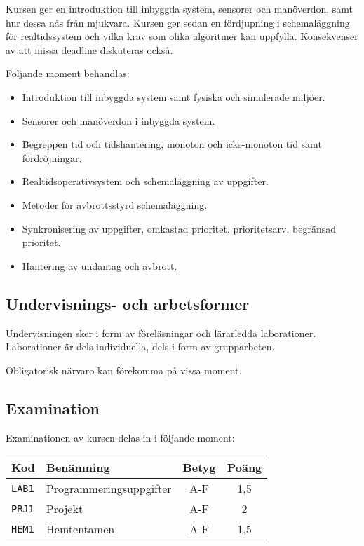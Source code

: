 Kursen ger en introduktion till inbyggda system, sensorer och
manöverdon, samt hur dessa nås från mjukvara. Kursen ger sedan en
fördjupning i schemaläggning för realtidssystem och vilka krav som olika
algoritmer kan uppfylla. Konsekvenser av att missa deadline diskuteras
också.

Följande moment behandlas:

\begin{itemize}
\tightlist
\item
  Introduktion till inbyggda system samt fysiska och simulerade miljöer.
\item
  Sensorer och manöverdon i inbyggda system.
\item
  Begreppen tid och tidshantering, monoton och icke-monoton tid samt
  fördröjningar.
\item
  Realtidsoperativsystem och schemaläggning av uppgifter.
\item
  Metoder för avbrottsstyrd schemaläggning.
\item
  Synkronisering av uppgifter, omkastad prioritet, prioritetsarv,
  begränsad prioritet.
\item
  Hantering av undantag och avbrott.
\end{itemize}

\subsection*{Undervisnings- och
arbetsformer}

Undervisningen sker i form av föreläsningar och lärarledda laborationer.
Laborationer är dels individuella, dels i form av grupparbeten.

Obligatorisk närvaro kan förekomma på vissa moment.

\subsection*{Examination}

Examinationen av kursen delas in i följande moment:

\begin{longtable}[]{@{}llcc@{}}
\toprule
\textsf{Kod} & \textsf{Benämning} & \textsf{Betyg} & \textsf{Poäng}\tabularnewline
\midrule
\endhead
\texttt{LAB1} & Programmeringsuppgifter & A-F & 1,5\tabularnewline
\texttt{PRJ1} & Projekt & A-F & 2\tabularnewline
\texttt{HEM1} & Hemtentamen & A-F & 1,5\tabularnewline
\bottomrule
\end{longtable}

